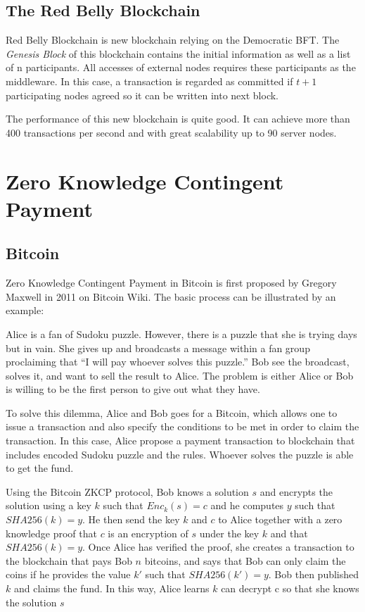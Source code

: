 \documentclass[12pt]{article}
\begin{document}
\subsection{The Red Belly Blockchain}

Red Belly Blockchain is new blockchain relying on the Democratic BFT. The \textit{Genesis Block} of this blockchain contains the initial information as well as a list of n participants. All accesses of external nodes requires these participants as the middleware. In this case, a transaction is regarded as committed if $t+1$ participating nodes agreed so it can be written into next block.

The performance of this new blockchain is quite good. It can achieve more than 400 transactions per second and with great scalability up to 90 server nodes.

\section{Zero Knowledge Contingent Payment}
\label{sec:Zero Knowledge Contingent Payment}

\subsection{Bitcoin}

Zero Knowledge Contingent Payment in Bitcoin is first proposed by Gregory Maxwell in 2011 on Bitcoin Wiki. The basic process can be illustrated by an example:

\begin{displayquote}
    Alice is a fan of Sudoku puzzle. However, there is a puzzle that she is trying days but in vain. She gives up and broadcasts a message within a fan group proclaiming that ``I will pay whoever solves this puzzle.'' Bob see the broadcast, solves it, and want to sell the result to Alice. The problem is either Alice or Bob is willing to be the first person to give out what they have.

    To solve this dilemma, Alice and Bob goes for a Bitcoin, which allows one to issue a transaction and also specify the conditions to be met in order to claim the transaction. In this case, Alice propose a payment transaction to blockchain that includes encoded Sudoku puzzle and the rules. Whoever solves the puzzle is able to get the fund.

    Using the Bitcoin ZKCP protocol, Bob knows a solution $s$ and encrypts the solution using a key $k$ such that $Enc_k(s)=c$ and he computes $y$ such that $SHA256(k)=y$. He then send the key $k$ and $c$ to Alice together with a zero knowledge proof that $c$ is an encryption of $s$ under the key $k$ and  that $SHA256(k)=y$. Once Alice has verified the proof, she creates a transaction to the blockchain that pays Bob $n$ bitcoins, and says that Bob can only claim the coins if he provides the value $k'$ such that $SHA256(k')=y$. Bob then published $k$ and claims the fund. In this way, Alice learns $k$ can decrypt c so that she knows the solution $s$
\end{displayquote}
\end{document}
